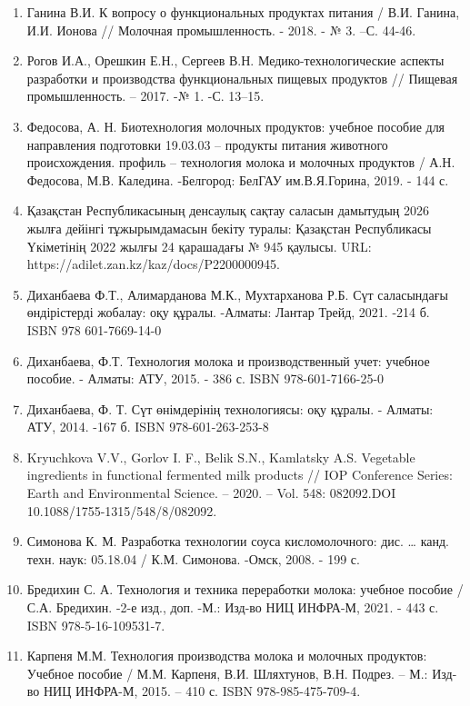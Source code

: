 {\begin{enumerate}
\def\labelenumi{\arabic{enumi}.}
\item
  Ганина В.И. К вопросу о функциональных продуктах питания / В.И.
  Ганина, И.И. Ионова // Молочная промышленность. - 2018. - № 3. --С.
  44-46.
\item
  Рогов И.А., Орешкин Е.Н., Сергеев В.Н. Медико-технологические аспекты
  разработки и производства функциональных пищевых продуктов // Пищевая
  промышленность. -- 2017. -№ 1. -С. 13--15.
\item
  Федосова, А. Н. Биотехнология молочных продуктов: учебное пособие для
  направления подготовки 19.03.03 -- продукты питания животного
  происхождения. профиль -- технология молока и молочных продуктов /
  А.Н. Федосова, М.В. Каледина. -Белгород: БелГАУ им.В.Я.Горина, 2019. -
  144 с.
\item
  Қазақстан Республикасының денсаулық сақтау саласын дамытудың 2026
  жылға дейінгі тұжырымдамасын бекіту туралы: Қазақстан Республикасы
  Үкіметінің 2022 жылғы 24 қарашадағы № 945 қаулысы. URL:
  https://adilet.zan.kz/kaz/docs/P2200000945.
\item
  Диханбаева Ф.Т., Алимарданова М.К., Мухтарханова Р.Б. Сүт саласындағы
  өндірістерді жобалау: оқу құралы. -Алматы: Лантар Трейд, 2021. -214 б.
  ISBN 978 601-7669-14-0
\item
  Диханбаева, Ф.Т. Технология молока и производственный учет: учебное
  пособие. - Алматы: АТУ, 2015. - 386 с. ISBN 978-601-7166-25-0
\item
  Диханбаева, Ф. Т. Сүт өнімдерінің технологиясы: оқу құралы. - Алматы:
  АТУ, 2014. -167 б. ISBN 978-601-263-253-8
\item
  Kryuchkova V.V., Gorlov I. F., Belik S.N., Kamlatsky A.S. Vegetable
  ingredients in functional fermented milk products // IOP Conference
  Series: Earth and Environmental Science. -- 2020. -- Vol. 548:
  082092.DOI 10.1088/1755-1315/548/8/082092.
\item
  Симонова К. М. Разработка технологии соуса кисломолочного: дис.
  \ldots{} канд. техн. наук: 05.18.04 / К.М. Симонова. -Омск, 2008. -
  199 с.
\item
  Бредихин С. А. Технология и техника переработки молока: учебное
  пособие / С.А. Бредихин. -2-е изд., доп. -М.: Изд-во НИЦ ИНФРА-М,
  2021. - 443 с. ISBN 978-5-16-109531-7.
\item
  Карпеня М.М. Технология производства молока и молочных продуктов:
  Учебное пособие / М.М. Карпеня, В.И. Шляхтунов, В.Н. Подрез. -- М.:
  Изд-во НИЦ ИНФРА-М, 2015. -- 410 с. ISBN 978-985-475-709-4.

\end{enumerate}}
